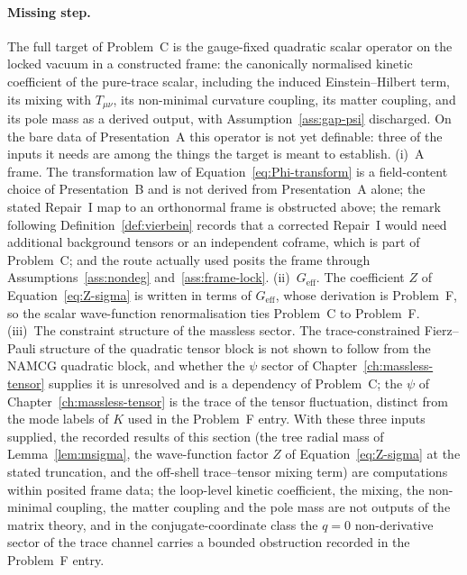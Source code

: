 \paragraph{Missing step.} The full target of Problem~C is the gauge-fixed quadratic scalar operator on the locked vacuum in a constructed frame: the canonically normalised kinetic coefficient of the pure-trace scalar, including the induced Einstein--Hilbert term, its mixing with \(T_{\mu\nu}\), its non-minimal curvature coupling, its matter coupling, and its pole mass as a derived output, with Assumption~\ref{ass:gap-psi} discharged. On the bare data of Presentation~A this operator is not yet definable: three of the inputs it needs are among the things the target is meant to establish. (i)~A frame. The transformation law of Equation~\eqref{eq:Phi-transform} is a field-content choice of Presentation~B and is not derived from Presentation~A alone; the stated Repair~I map to an orthonormal frame is obstructed above; the remark following Definition~\ref{def:vierbein} records that a corrected Repair~I would need additional background tensors or an independent coframe, which is part of Problem~C; and the route actually used posits the frame through Assumptions~\ref{ass:nondeg} and~\ref{ass:frame-lock}. (ii)~\(G_{\mathrm{eff}}\). The coefficient \(Z\) of Equation~\eqref{eq:Z-sigma} is written in terms of \(G_{\mathrm{eff}}\), whose derivation is Problem~F, so the scalar wave-function renormalisation ties Problem~C to Problem~F. (iii)~The constraint structure of the massless sector. The trace-constrained Fierz--Pauli structure of the quadratic tensor block is not shown to follow from the NAMCG quadratic block, and whether the \(\psi\) sector of Chapter~\ref{ch:massless-tensor} supplies it is unresolved and is a dependency of Problem~C; the \(\psi\) of Chapter~\ref{ch:massless-tensor} is the trace of the tensor fluctuation, distinct from the mode labels of \(K\) used in the Problem~F entry. With these three inputs supplied, the recorded results of this section (the tree radial mass of Lemma~\ref{lem:msigma}, the wave-function factor \(Z\) of Equation~\eqref{eq:Z-sigma} at the stated truncation, and the off-shell trace--tensor mixing term) are computations within posited frame data; the loop-level kinetic coefficient, the mixing, the non-minimal coupling, the matter coupling and the pole mass are not outputs of the matrix theory, and in the conjugate-coordinate class the \(q=0\) non-derivative sector of the trace channel carries a bounded obstruction recorded in the Problem~F entry.
